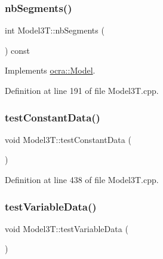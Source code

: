 \hypertarget{classModel3T_af8ca577236d173d0f7860263fb7872a4}{}\label{classModel3T_af8ca577236d173d0f7860263fb7872a4} 
\subsubsection{\texorpdfstring{nb\+Segments()}{nbSegments()}}
{\footnotesize\ttfamily int Model3\+T\+::nb\+Segments (\begin{DoxyParamCaption}{ }\end{DoxyParamCaption}) const\hspace{0.3cm}{\ttfamily [virtual]}}



Implements \hyperlink{classocra_1_1Model_acd57284b64bb5c05f4c2dac643476751}{ocra\+::\+Model}.



Definition at line 191 of file Model3\+T.\+cpp.

\hypertarget{classModel3T_a798623e95a444c26dab02b874ee1ae89}{}\label{classModel3T_a798623e95a444c26dab02b874ee1ae89} 
\subsubsection{\texorpdfstring{test\+Constant\+Data()}{testConstantData()}}
{\footnotesize\ttfamily void Model3\+T\+::test\+Constant\+Data (\begin{DoxyParamCaption}{ }\end{DoxyParamCaption})}



Definition at line 438 of file Model3\+T.\+cpp.

\hypertarget{classModel3T_a8f52bbc47b370c56b55dc4784bcd6fb2}{}\label{classModel3T_a8f52bbc47b370c56b55dc4784bcd6fb2} 
\subsubsection{\texorpdfstring{test\+Variable\+Data()}{testVariableData()}}
{\footnotesize\ttfamily void Model3\+T\+::test\+Variable\+Data (\begin{DoxyParamCaption}{ }\end{DoxyParamCaption})}



